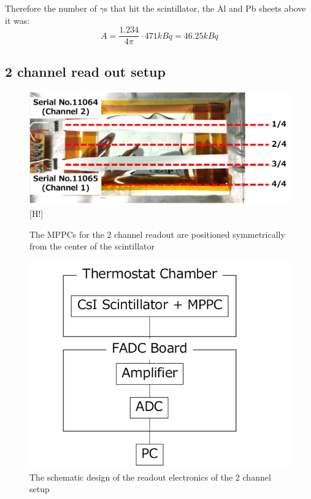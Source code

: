 \documentclass[12pt, a4paper,titlepage]{article}
\numberwithin{equation}{section}
\numberwithin{figure}{section}
\begin{document}
 Therefore the number of $\gamma$s that hit the scintillator, the Al and Pb sheets above it was:
$$A = \frac{1.234}{4 \pi} \cdot 471 kBq = 46.25 kBq$$

\pagebreak

\subsection{2 channel read out setup}

\begin{figure}[h!]
\centering
\includegraphics[width=130.0mm]{images/2channelsetup.png}[H!]
\caption{The MPPCs for the 2 channel readout are positioned symmetrically from the center of the scintillator}
\end{figure}

\begin{figure}[h!]
\centering
\includegraphics[width=130.0mm]{images/2channelelectronics.png}
\caption{The schematic design of the readout electronics of the 2 channel setup}
\end{figure}
\end{document}
